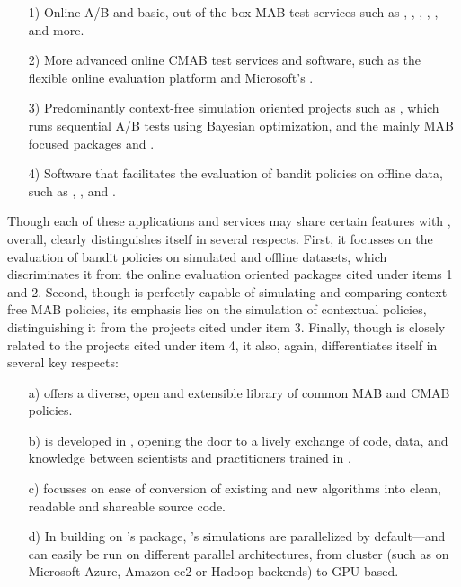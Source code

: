 \documentclass{jss}
\begin{document}
\begin{enumerate}
          \item[1)]Online A/B and basic, out-of-the-box MAB test services such as  \citep{BibEntry2018Aug2},  \citep{BibEntry2018Aug3},  \citep{BibEntry2018Aug1},  \citep{BibEntry2018AugA},  \citep{BibEntry2018AugB}, and more.
          \item[2)]More advanced online CMAB test services and software, such as the flexible online evaluation platform  \citep{Kaptein2016} and Microsoft's  \citep{Agarwal2016}.
          \item[3)]Predominantly context-free simulation oriented projects such as  \citep{2018}, which runs sequential A/B tests using Bayesian optimization, and the mainly MAB focused  packages  \citep{striatum} and  \citep{SMPyBandits}.
          \item[4)]Software that facilitates the evaluation of bandit policies on offline data, such as  \citep{Langford2007},  \citep{Hido2013}, and  \citep{Abadi2016}.
\end{enumerate}

Though each of these applications and services may share certain features with , overall,  clearly distinguishes itself in several respects.  First, it focusses on the evaluation of bandit policies on simulated and offline datasets, which discriminates it from the online evaluation oriented packages cited under items 1 and 2. Second, though  is perfectly capable of simulating and comparing context-free MAB policies, its emphasis lies on the simulation of contextual policies, distinguishing it from the projects cited under item 3. Finally, though  is closely related to the projects cited under item 4, it also, again, differentiates itself in several key respects:

\begin{enumerate}
          \item[a)] offers a diverse, open and extensible library of common MAB and CMAB policies.
          \item[b)] is developed in , opening the door to a lively exchange of code, data, and knowledge between scientists and practitioners trained in .
          \item[c)] focusses on ease of conversion of existing and new algorithms into clean, readable and shareable source code.
          \item[d)]In building on 's  package, 's simulations are parallelized by default---and can easily be run on different parallel architectures, from cluster (such as on Microsoft Azure, Amazon ec2 or Hadoop backends) to GPU based.
\end{enumerate}
\end{document}
